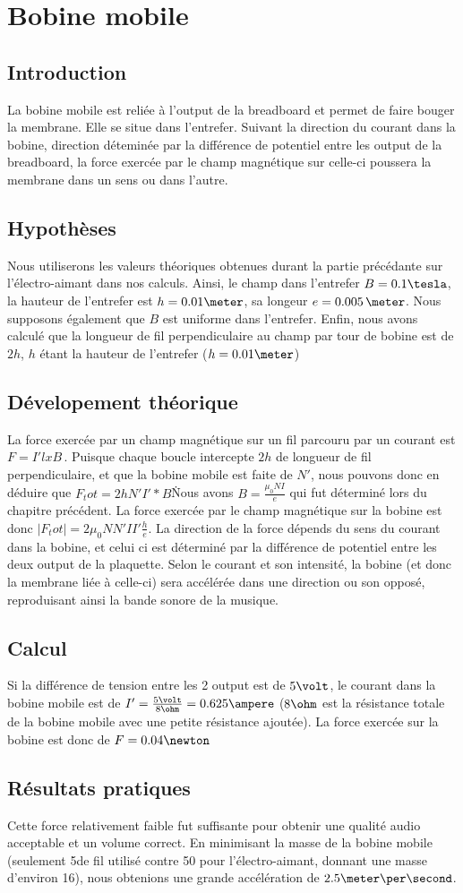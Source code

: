\chapter{Bobine mobile}
\section{Introduction}
La bobine mobile est reliée à l'output de la breadboard et permet de faire bouger la membrane. Elle se situe dans 
l'entrefer. Suivant la direction du courant dans la bobine, direction déteminée par la différence de potentiel
entre les output de la breadboard, la force exercée par le champ magnétique sur celle-ci poussera la 
membrane dans un sens ou dans l'autre.
\section{Hypothèses}
Nous utiliserons les valeurs théoriques obtenues durant la partie précédante sur l'électro-aimant dans nos calculs.
Ainsi, le champ dans l'entrefer $B = 0.1\tesla$, la hauteur de l'entrefer est $h = 0.01\meter$, sa longeur 
$e = 0.005\,\meter$. Nous supposons également que $B$ est uniforme dans l'entrefer. Enfin, nous avons 
calculé que la longueur de fil perpendiculaire au champ par tour de bobine est de $2h$, $h$ étant 
la hauteur de l'entrefer ($h = 0.01\meter$) 
\section{Dévelopement théorique}
La force exercée par un champ magnétique sur un fil parcouru par un courant est $F =  I' l x B$\,. Puisque 
chaque boucle intercepte $2h$ de longueur de fil perpendiculaire, et que la bobine mobile est faite de $N'$, nous pouvons
donc en déduire que $F_tot = 2h N' I' * B$\. Nous avons $B = \frac{\mu_0 N I}{e}$ qui fut déterminé 
lors du chapitre précédent. La force exercée par le champ magnétique sur la bobine est donc 
$ |F_tot| = 2 \mu_0 N N' I I' \frac{h}{e}$. La direction de la force dépends du sens du courant dans la bobine, et 
celui ci est déterminé par la différence de potentiel entre les deux output de la plaquette. Selon le courant et son
intensité, la bobine (et donc la membrane liée à celle-ci) sera accélérée dans une direction ou son opposé, reproduisant 
ainsi la bande sonore de la musique.
\section{Calcul}
Si la différence de tension entre les 2 output est de $5\volt$, le courant dans la bobine mobile est de 
$I' = \frac{5\volt}{8\ohm} = 0.625\ampere$ ($8\ohm$ est la résistance totale de la bobine mobile avec une petite 
résistance ajoutée). La force exercée sur la bobine est donc de $F = 0.04 \newton$
\section{Résultats pratiques}
Cette force relativement faible fut suffisante pour obtenir une qualité audio acceptable et un volume correct. 
En minimisant la masse de la bobine mobile (seulement 5\meter de fil utilisé contre 50 pour l'électro-aimant, 
donnant une masse d'environ 16\gram), nous obtenions une grande accélération de $2.5\meter\per\second$. 
